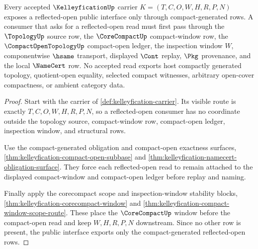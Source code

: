 \begin{theorem}
\label{thm:kelleyfication-reflection-public-interface}
Every accepted $\KelleyficationUp$ carrier $K=(T,C,O,W,H,R,P,N)$ exposes a reflected-open public interface only through compact-generated rows. A consumer that asks for a reflected-open read must first pass through the $\TopologyUp$ source row, the $\CoreCompactUp$ compact-window row, the $\CompactOpenTopologyUp$ compact-open ledger, the inspection window $W$, componentwise $\hsame$ transport, displayed $\Cont$ replay, $\Pkg$ provenance, and the local $\NameCert$ row. No accepted read exports host compactly generated topology, quotient-open equality, selected compact witnesses, arbitrary open-cover compactness, or ambient category data.
\end{theorem}
\begin{proof}
Start with the carrier of \autoref{def:kelleyfication-carrier}. Its visible route is exactly $T,C,O,W,H,R,P,N$, so a reflected-open consumer has no coordinate outside the topology source, compact-window row, compact-open ledger, inspection window, and structural rows.

Use the compact-generated obligation and compact-open exactness surfaces, \autoref{thm:kelleyfication-compact-open-subbase} and \autoref{thm:kelleyfication-namecert-obligation-surface}. They force each reflected-open read to remain attached to the displayed compact-window and compact-open ledger before replay and naming.

Finally apply the corecompact scope and inspection-window stability blocks, \autoref{thm:kelleyfication-corecompact-window} and \autoref{thm:kelleyfication-compact-window-scope-route}. These place the $\CoreCompactUp$ window before the compact-open read and keep $W,H,R,P,N$ downstream. Since no other row is present, the public interface exports only the compact-generated reflected-open rows.
\end{proof}

